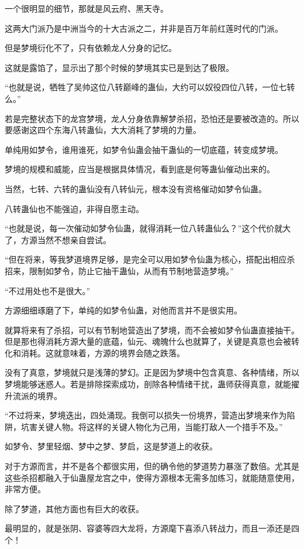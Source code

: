 \begin{this_body}
一个很明显的细节，那就是风云府、黑天寺。

这两大门派乃是中洲当今的十大古派之二，并非是百万年前红莲时代的门派。

但是梦境衍化不了，只有依赖龙人分身的记忆。

这就是露馅了，显示出了那个时候的梦境其实已是到达了极限。

“也就是说，牺牲了吴帅这位八转巅峰的蛊仙，大约可以奴役四位八转，一位七转么。”

若是完整状态下的龙宫梦境，龙人分身依靠解梦杀招，恐怕还是要被改造的。所以要感谢这四个东海八转蛊仙，大大消耗了梦境的力量。

单纯用如梦令，谁用谁死，如梦令仙蛊会抽干蛊仙的一切底蕴，转变成梦境。

梦境的规模和威能，应当是根据具体情况，看到底是何等蛊仙催动出来的。

当然，七转、六转的蛊仙没有八转仙元，根本没有资格催动如梦令仙蛊。

八转蛊仙也不能强迫，非得自愿主动。

“也就是说，每一次催动如梦令仙蛊，就得消耗一位八转蛊仙么？”这个代价就大了，方源当然不想亲自尝试。

“但在将来，等我梦道境界足够，是完全可以用如梦令仙蛊为核心，搭配出相应杀招来，限制如梦令，防止它抽干蛊仙，从而有节制地营造梦境。”

“不过用处也不是很大。”

方源细细琢磨了下，单纯的如梦令仙蛊，对他而言并不是很实用。

就算将来有了杀招，可以有节制地营造出了梦境，而不会被如梦令仙蛊直接抽干。但是那也得消耗方源大量的底蕴，仙元、魂魄什么也就算了，关键是真意也会被转化和消耗。这就意味着，方源的境界会随之跌落。

没有了真意，梦境就只是浅薄的梦幻。正是因为梦境中包含真意、各种情绪，所以梦境能够迷惑人。若是排除探索成功，剖除各种情绪干扰，蛊师获得真意，就能擢升流派的境界。

“不过将来，梦境迭出，四处涌现。我倒可以损失一份境界，营造出梦境来作为陷阱，坑害关键人物。将这样的关键人物化为己用，当能打敌人一个措手不及。”

如梦令、梦里轻烟、梦中之梦、梦启，这是梦道上的收获。

对于方源而言，并不是各个都很实用，但的确令他的梦道势力暴涨了数倍。尤其是这些杀招都融入于仙蛊屋龙宫之中，使得方源根本无需多加练习，就能随意使用，非常方便。

除了梦道，其他方面也有巨大的收获。

最明显的，就是张阴、容婆等四大龙将，方源麾下喜添八转战力，而且一添还是四个！


\end{this_body}
